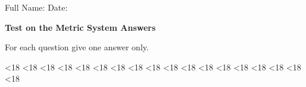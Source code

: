 \documentclass{./units4school}
\begin{document}
Full Name: %
\raisebox{-2pt}{\rule[-.4ex]{5cm}{.4pt}}\hfill%
Date: %
\raisebox{-2pt}{\rule[-.4ex]{3cm}{.4pt}}
\hspace*{.5cm}%


\vspace{6mm}
\textbf{\large Test on the Metric System \ifprintanswers \hfill \textcolor{AccentColor}{Answers}
\fi
}%
\vspace{3mm}

For each question give one answer only.








\ifnum\theexerciseID<18 {} \fi
\ifnum\theexerciseID<18 {} \fi
\ifnum\theexerciseID<18 {} \fi
\ifnum\theexerciseID<18 {} \fi
\ifnum\theexerciseID<18 {} \fi
\ifnum\theexerciseID<18 {} \fi
\ifnum\theexerciseID<18 {} \fi
\ifnum\theexerciseID<18 {} \fi
\ifnum\theexerciseID<18 {} \fi
\ifnum\theexerciseID<18 {} \fi
\ifnum\theexerciseID<18 {} \fi
\ifnum\theexerciseID<18 {} \fi
\ifnum\theexerciseID<18 {} \fi
\ifnum\theexerciseID<18 {} \fi
\ifnum\theexerciseID<18 {} \fi
\ifnum\theexerciseID<18 {} \fi
\ifnum\theexerciseID<18 {} \fi
\ifnum\theexerciseID<18 {} \fi
\end{document}
